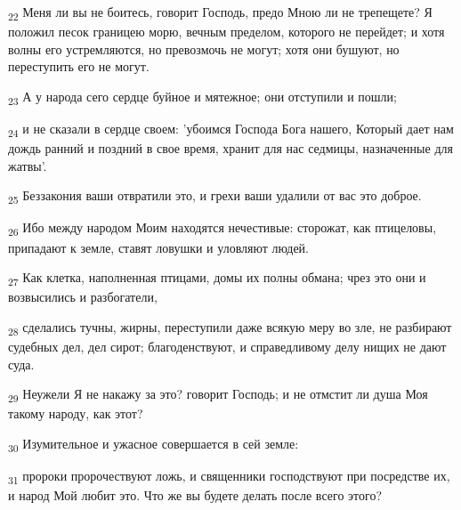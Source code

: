 \begin{tcolorbox}
\textsubscript{22} Меня ли вы не боитесь, говорит Господь, предо Мною ли не трепещете? Я положил песок границею морю, вечным пределом, которого не перейдет; и хотя волны его устремляются, но превозмочь не могут; хотя они бушуют, но переступить его не могут.
\end{tcolorbox}
\begin{tcolorbox}
\textsubscript{23} А у народа сего сердце буйное и мятежное; они отступили и пошли;
\end{tcolorbox}
\begin{tcolorbox}
\textsubscript{24} и не сказали в сердце своем: 'убоимся Господа Бога нашего, Который дает нам дождь ранний и поздний в свое время, хранит для нас седмицы, назначенные для жатвы'.
\end{tcolorbox}
\begin{tcolorbox}
\textsubscript{25} Беззакония ваши отвратили это, и грехи ваши удалили от вас это доброе.
\end{tcolorbox}
\begin{tcolorbox}
\textsubscript{26} Ибо между народом Моим находятся нечестивые: сторожат, как птицеловы, припадают к земле, ставят ловушки и уловляют людей.
\end{tcolorbox}
\begin{tcolorbox}
\textsubscript{27} Как клетка, наполненная птицами, домы их полны обмана; чрез это они и возвысились и разбогатели,
\end{tcolorbox}
\begin{tcolorbox}
\textsubscript{28} сделались тучны, жирны, переступили даже всякую меру во зле, не разбирают судебных дел, дел сирот; благоденствуют, и справедливому делу нищих не дают суда.
\end{tcolorbox}
\begin{tcolorbox}
\textsubscript{29} Неужели Я не накажу за это? говорит Господь; и не отмстит ли душа Моя такому народу, как этот?
\end{tcolorbox}
\begin{tcolorbox}
\textsubscript{30} Изумительное и ужасное совершается в сей земле:
\end{tcolorbox}
\begin{tcolorbox}
\textsubscript{31} пророки пророчествуют ложь, и священники господствуют при посредстве их, и народ Мой любит это. Что же вы будете делать после всего этого?
\end{tcolorbox}
